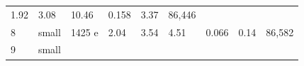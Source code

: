 \documentclass[
  10pt, ]{article}
\begin{document}
\begin{longtable}[]{@{}lllllllll@{}}
\begin{minipage}[t]{0.08\columnwidth}
1.92\strut
\end{minipage} & \begin{minipage}[t]{0.08\columnwidth}\raggedright
3.08\strut
\end{minipage} & \begin{minipage}[t]{0.08\columnwidth}\raggedright
10.46\strut
\end{minipage} & \begin{minipage}[t]{0.08\columnwidth}\raggedright
0.158\strut
\end{minipage} & \begin{minipage}[t]{0.08\columnwidth}\raggedright
3.37\strut
\end{minipage} & \begin{minipage}[t]{0.08\columnwidth}\raggedright
86,446\strut
\end{minipage}\tabularnewline
\begin{minipage}[t]{0.08\columnwidth}\raggedright
8\strut
\end{minipage} & \begin{minipage}[t]{0.08\columnwidth}\raggedright
small\strut
\end{minipage} & \begin{minipage}[t]{0.08\columnwidth}\raggedright
1425 e\strut
\end{minipage} & \begin{minipage}[t]{0.08\columnwidth}\raggedright
2.04\strut
\end{minipage} & \begin{minipage}[t]{0.08\columnwidth}\raggedright
3.54\strut
\end{minipage} & \begin{minipage}[t]{0.08\columnwidth}\raggedright
4.51\strut
\end{minipage} & \begin{minipage}[t]{0.08\columnwidth}\raggedright
0.066\strut
\end{minipage} & \begin{minipage}[t]{0.08\columnwidth}\raggedright
0.14\strut
\end{minipage} & \begin{minipage}[t]{0.08\columnwidth}\raggedright
86,582\strut
\end{minipage}\tabularnewline
\begin{minipage}[t]{0.08\columnwidth}\raggedright
9\strut
\end{minipage} & \begin{minipage}[t]{0.08\columnwidth}\raggedright
small\strut
\end{minipage} & \begin{minipage}[t]{0.08\columnwidth}\raggedright

\end{minipage}
\end{longtable}
\end{document}
